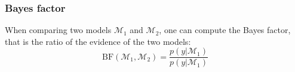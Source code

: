 \documentclass[a4paper,11pt]{article}
\theoremstyle{defi}
\numberwithin{thmCounter}{section}
\begin{document}
\subsubsection{Bayes factor}
When comparing two models $\mathcal{M}_1$ and $\mathcal{M}_2$, one can compute the Bayes factor, that is the ratio of the evidence of the two models:
\begin{equation}
  \label{eq:bayes_factor}
  \mathrm{BF}(\mathcal{M}_1, \mathcal{M}_2) = \frac{p(y | \mathcal{M}_1)}{p(y | \mathcal{M}_1)}
\end{equation}
\end{document}
